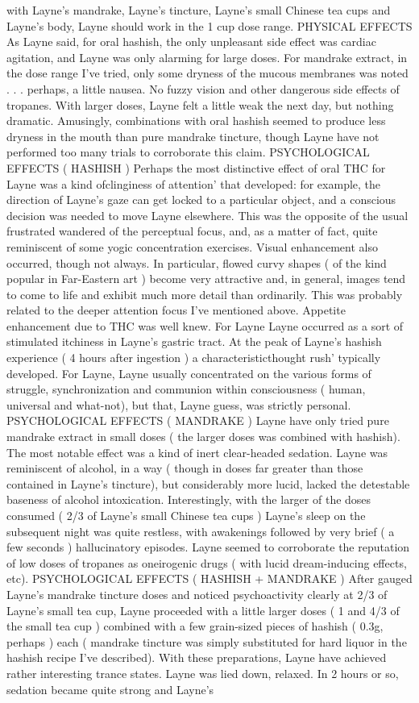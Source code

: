 \documentclass[12pt]{book}
\begin{document}
with Layne's mandrake, Layne's tincture, Layne's small Chinese tea cups and Layne's body, Layne should work in the 1 cup dose range. PHYSICAL EFFECTS As Layne said, for oral hashish, the only unpleasant side effect was cardiac agitation, and Layne was only alarming for large doses. For mandrake extract, in the dose range I've tried, only some dryness of the mucous membranes was noted . . .  perhaps, a little nausea. No fuzzy vision and other dangerous side effects of tropanes. With larger doses, Layne felt a little weak the next day, but nothing dramatic. Amusingly, combinations with oral hashish seemed to produce less dryness in the mouth than pure mandrake tincture, though Layne have not performed too many trials to corroborate this claim. PSYCHOLOGICAL EFFECTS ( HASHISH ) Perhaps the most distinctive effect of oral THC for Layne was a kind ofclinginess of attention' that developed: for example, the direction of Layne's gaze can get locked to a particular object, and a conscious decision was needed to move Layne elsewhere. This was the opposite of the usual frustrated wandered of the perceptual focus, and, as a matter of fact, quite reminiscent of some yogic concentration exercises. Visual enhancement also occurred, though not always. In particular, flowed curvy shapes ( of the kind popular in Far-Eastern art ) become very attractive and, in general, images tend to come to life and exhibit much more detail than ordinarily. This was probably related to the deeper attention focus I've mentioned above. Appetite enhancement due to THC was well knew. For Layne Layne occurred as a sort of stimulated itchiness in Layne's gastric tract. At the peak of Layne's hashish experience ( 4 hours after ingestion ) a characteristicthought rush' typically developed. For Layne, Layne usually concentrated on the various forms of struggle, synchronization and communion within consciousness ( human, universal and what-not), but that, Layne guess, was strictly personal. PSYCHOLOGICAL EFFECTS ( MANDRAKE ) Layne have only tried pure mandrake extract in small doses ( the larger doses was combined with hashish). The most notable effect was a kind of inert clear-headed sedation. Layne was reminiscent of alcohol, in a way ( though in doses far greater than those contained in Layne's tincture), but considerably more lucid, lacked the detestable baseness of alcohol intoxication. Interestingly, with the larger of the doses consumed ( 2/3 of Layne's small Chinese tea cups ) Layne's sleep on the subsequent night was quite restless, with awakenings followed by very brief ( a few seconds ) hallucinatory episodes. Layne seemed to corroborate the reputation of low doses of tropanes as oneirogenic drugs ( with lucid dream-inducing effects, etc). PSYCHOLOGICAL EFFECTS ( HASHISH + MANDRAKE ) After gauged Layne's mandrake tincture doses and noticed psychoactivity clearly at 2/3 of Layne's small tea cup, Layne proceeded with a little larger doses ( 1 and 4/3 of the small tea cup ) combined with a few grain-sized pieces of hashish ( 0.3g, perhaps ) each ( mandrake tincture was simply substituted for hard liquor in the hashish recipe I've described). With these preparations, Layne have achieved rather interesting trance states. Layne was lied down, relaxed. In 2 hours or so, sedation became quite strong and Layne's 
\end{document}
